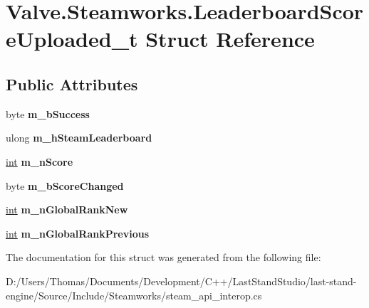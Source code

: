 \hypertarget{structValve_1_1Steamworks_1_1LeaderboardScoreUploaded__t}{}\section{Valve.\+Steamworks.\+Leaderboard\+Score\+Uploaded\+\_\+t Struct Reference}
\label{structValve_1_1Steamworks_1_1LeaderboardScoreUploaded__t}
\subsection*{Public Attributes}
\begin{DoxyCompactItemize}
\item 
\hypertarget{structValve_1_1Steamworks_1_1LeaderboardScoreUploaded__t_a44464316ad03fe27f352e49e1d43ce62}{}byte {\bfseries m\+\_\+b\+Success}\label{structValve_1_1Steamworks_1_1LeaderboardScoreUploaded__t_a44464316ad03fe27f352e49e1d43ce62}

\item 
\hypertarget{structValve_1_1Steamworks_1_1LeaderboardScoreUploaded__t_a7ca282b3004a3bec7619a514469cacb9}{}ulong {\bfseries m\+\_\+h\+Steam\+Leaderboard}\label{structValve_1_1Steamworks_1_1LeaderboardScoreUploaded__t_a7ca282b3004a3bec7619a514469cacb9}

\item 
\hypertarget{structValve_1_1Steamworks_1_1LeaderboardScoreUploaded__t_a58b7c1f2a63ccf6526cef85563e87a95}{}\hyperlink{SDL__thread_8h_a6a64f9be4433e4de6e2f2f548cf3c08e}{int} {\bfseries m\+\_\+n\+Score}\label{structValve_1_1Steamworks_1_1LeaderboardScoreUploaded__t_a58b7c1f2a63ccf6526cef85563e87a95}

\item 
\hypertarget{structValve_1_1Steamworks_1_1LeaderboardScoreUploaded__t_a6aa605696d1873906c4acada953a395a}{}byte {\bfseries m\+\_\+b\+Score\+Changed}\label{structValve_1_1Steamworks_1_1LeaderboardScoreUploaded__t_a6aa605696d1873906c4acada953a395a}

\item 
\hypertarget{structValve_1_1Steamworks_1_1LeaderboardScoreUploaded__t_ab970df4e15f011e7d5622f75a4792c37}{}\hyperlink{SDL__thread_8h_a6a64f9be4433e4de6e2f2f548cf3c08e}{int} {\bfseries m\+\_\+n\+Global\+Rank\+New}\label{structValve_1_1Steamworks_1_1LeaderboardScoreUploaded__t_ab970df4e15f011e7d5622f75a4792c37}

\item 
\hypertarget{structValve_1_1Steamworks_1_1LeaderboardScoreUploaded__t_ad4eb8bc8cbec2cf843a46d2c8c4aba96}{}\hyperlink{SDL__thread_8h_a6a64f9be4433e4de6e2f2f548cf3c08e}{int} {\bfseries m\+\_\+n\+Global\+Rank\+Previous}\label{structValve_1_1Steamworks_1_1LeaderboardScoreUploaded__t_ad4eb8bc8cbec2cf843a46d2c8c4aba96}

\end{DoxyCompactItemize}


The documentation for this struct was generated from the following file\+:\begin{DoxyCompactItemize}
\item 
D\+:/\+Users/\+Thomas/\+Documents/\+Development/\+C++/\+Last\+Stand\+Studio/last-\/stand-\/engine/\+Source/\+Include/\+Steamworks/steam\+\_\+api\+\_\+interop.\+cs\end{DoxyCompactItemize}
